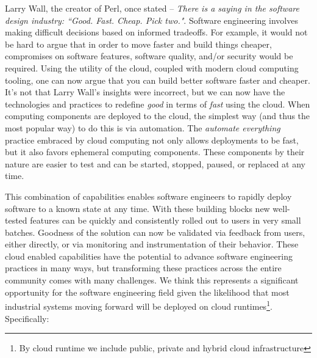 \documentclass[conference]{IEEEtran}
\begin{document}
Larry Wall, the creator of Perl, once stated -- \textit{There is a saying in the software design industry: ``Good. Fast. Cheap. Pick two."}.  Software engineering involves making difficult decisions based on informed tradeoffs.  For example, it would not be hard to argue that in order to move faster and build things cheaper, compromises on software features, software quality, and/or security would be required. Using the utility of the cloud, coupled with modern cloud computing tooling, one can now argue that you can build better software faster and cheaper.  It's not that Larry Wall's insights were incorrect, but we can now have the technologies and practices to redefine \textit{good} in terms of \textit{fast} using the cloud.  When computing components are deployed to the cloud, the simplest way (and thus the most popular way) to do this is via automation\cite{terraform, AWSCloudFormation, AzureLaunch, Pulumi}.  The \textit{automate everything} practice embraced by cloud computing not only allows deployments to be fast, but it also favors ephemeral computing components. These components by their nature are easier to test\cite{kim2016devops} and can be started, stopped, paused, or replaced at any time. 

This combination of capabilities enables software engineers to rapidly deploy software to a known state at any time. With these building blocks new well-tested features can be quickly and consistently rolled out to users in very small batches.  Goodness of the solution can now be validated via feedback from users, either directly, or via monitoring and instrumentation of their behavior.  These cloud enabled capabilities have the potential to advance software engineering practices in many ways, but transforming these practices across the entire community comes with many challenges. We think this represents a significant opportunity for the software engineering field given the likelihood that most industrial systems moving forward will be deployed on cloud runtimes\footnote{By cloud runtime we include public, private and hybrid cloud infrastructure}. Specifically:
\end{document}
